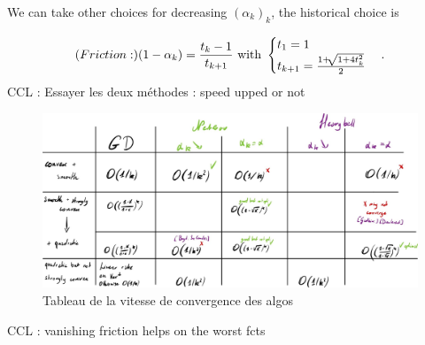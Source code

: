 We can take other choices for decreasing $(\alpha _k)_k$, the historical choice is


\[
    \text(Friction : )(1 - \alpha _k) = \frac{t_k - 1 }{t_{k+1}} \text{ with } \begin{cases}
        t_1 = 1 \\
        t_{k+1} = \frac{1 + \sqrt[]{1 + 4 t _k ^2}}{2} \\
    \end{cases} 
.\]
CCL : Essayer les deux méthodes : speed upped or not 

\begin{figure}[htbp]
    \centering
    \includegraphics[width=.95\textwidth]{figs/table_conv_speed.jpg}
    \caption{Tableau de la vitesse de convergence des algos}
\end{figure}

CCL : vanishing friction helps on the worst fcts
